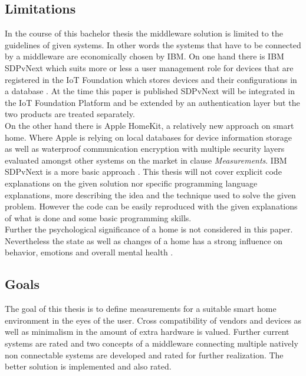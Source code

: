 \subsection{Limitations}
	In the course of this bachelor thesis the middleware solution is limited to the guidelines of given systems. In other words the systems that have to be connected by a middleware are economically chosen by IBM. On one hand there is IBM SDPvNext which suits more or less a user management role for devices that are registered in the IoT Foundation which stores devices and their configurations in a database \parencite{FrankLeo}. At the time this paper is published SDPvNext will be integrated in the IoT Foundation Platform and be extended by an authentication layer \parencite{PatriziaGufler} but the two products are treated separately. \\

	On the other hand there is Apple HomeKit, a relatively new approach on smart home. Where Apple is relying on local databases for device information storage as well as waterproof communication encryption with multiple security layers \textcite{IntroToHomeKit} evaluated amongst other systems on the market in clause \textit{Measurements}. IBM SDPvNext is a more basic approach \textcite{FrankLeo}. This thesis will not cover explicit code explanations on the given solution nor specific programming language explanations, more describing the idea and the technique used to solve the given problem. However the code can be easily reproduced with the given explanations of what is done and some basic programming skills.\\

	Further the psychological significance of a home is not considered in this paper. Nevertheless the state as well as changes of a home has a strong influence on behavior, emotions and overall mental health \textcite{youngRefugees}.

\subsection{Goals}
	The goal of this thesis is to define measurements for a suitable smart home environment in the eyes of the user. Cross compatibility of vendors and devices as well as minimalism in the amount of extra hardware is valued. Further current systems are rated and two concepts of a middleware connecting multiple natively non connectable systems are developed and rated for further realization. The better solution is implemented and also rated.


